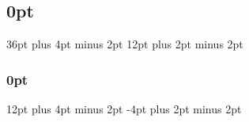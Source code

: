 \newcommand{\ksspace}{\hspace{1em}}

\usepackage{subcaption}

\renewcommand{\cftchapfont}{\sffamily\bfseries}
\renewcommand{\cftsecfont}{\sffamily}
\renewcommand{\cftchappagefont}{\sffamily\bfseries}
\renewcommand{\cftsecpagefont}{\sffamily}

\renewcommand{\cftfigfont}{\sffamily}
\renewcommand{\cfttabfont}{\sffamily}
\renewcommand{\cftfigpagefont}{\sffamily}
\renewcommand{\cfttabpagefont}{\sffamily}


\setlength{\cftfignumwidth}{3em}
\setlength{\cfttabnumwidth}{3em}


\usepackage[nottoc]{tocbibind}


\usepackage{makeidx} 
\makeindex 

\usepackage{makecell}


\newcommand{\interdis}{$\star$}

\titlespacing\subsection{0pt}
                        {36pt plus 4pt minus 2pt}
                        {12pt plus 2pt minus 2pt}
\titlespacing\subsubsection{0pt}
                           {12pt plus 4pt minus 2pt}
                           {-4pt plus 2pt minus 2pt}


